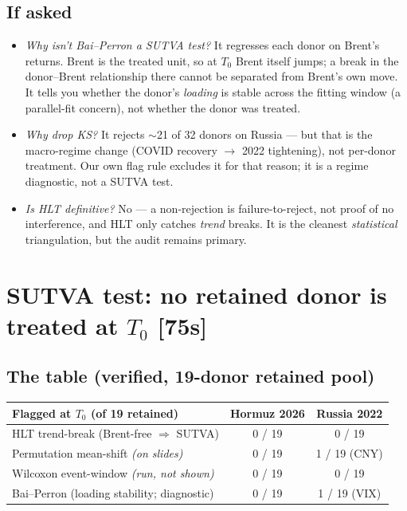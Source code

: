\documentclass[11pt,a4paper]{article}
\newcommand{\timetag}[1]{\hfill\textcolor{muted}{\small[#1]}}
\begin{document}
\subsection{If asked}
\begin{itemize}
  \item \textit{Why isn't Bai--Perron a SUTVA test?} It regresses each donor on Brent's returns. Brent
    is the treated unit, so at $T_0$ Brent itself jumps; a break in the donor--Brent relationship there
    cannot be separated from Brent's own move. It tells you whether the donor's \emph{loading} is stable
    across the fitting window (a parallel-fit concern), not whether the donor was treated.
  \item \textit{Why drop KS?} It rejects $\sim$21 of 32 donors on Russia --- but that is the macro-regime
    change (COVID recovery $\to$ 2022 tightening), not per-donor treatment. Our own flag rule excludes it
    for that reason; it is a regime diagnostic, not a SUTVA test.
  \item \textit{Is HLT definitive?} No --- a non-rejection is failure-to-reject, not proof of no
    interference, and HLT only catches \emph{trend} breaks. It is the cleanest \emph{statistical}
    triangulation, but the audit remains primary.
\end{itemize}

\section{SUTVA test: no retained donor is treated at $T_0$ \timetag{75s}}

\subsection{The table (verified, 19-donor retained pool)}
\begin{center}
\begin{tabular}{@{}l c c@{}}
  \toprule
  \textbf{Flagged at $T_0$ (of 19 retained)} & \textbf{Hormuz 2026} & \textbf{Russia 2022} \\
  \midrule
  HLT trend-break (Brent-free $\Rightarrow$ SUTVA)   & 0 / 19 & 0 / 19 \\
  Permutation mean-shift \emph{(on slides)}          & 0 / 19 & 1 / 19 (CNY) \\
  Wilcoxon event-window \emph{(run, not shown)}      & 0 / 19 & 0 / 19 \\
  Bai--Perron (loading stability; diagnostic)        & 0 / 19 & 1 / 19 (VIX) \\
  \bottomrule
\end{tabular}
\end{center}
\end{document}
